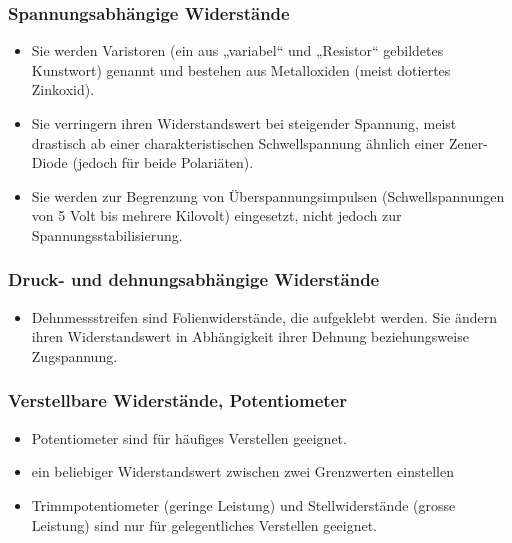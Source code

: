\subsubsection{Spannungsabhängige Widerstände}
\begin{itemize}
  \item Sie werden Varistoren (ein aus „variabel“ und „Resistor“ gebildetes
  Kunstwort) genannt und bestehen aus Metalloxiden (meist dotiertes Zinkoxid).
  \item Sie verringern ihren Widerstandswert bei steigender Spannung, meist
  drastisch ab einer charakteristischen Schwellspannung ähnlich einer
  Zener-Diode (jedoch für beide Polariäten).
  \item Sie werden zur Begrenzung von Überspannungsimpulsen (Schwellspannungen
  von 5 Volt bis mehrere Kilovolt) eingesetzt, nicht jedoch zur Spannungsstabilisierung.
\end{itemize}

\subsubsection{Druck- und dehnungsabhängige Widerstände}
\begin{itemize}
  \item Dehnmessstreifen sind Folienwiderstände, die aufgeklebt werden. Sie
  ändern ihren Widerstandswert in Abhängigkeit ihrer Dehnung beziehungsweise
  Zugspannung.
\end{itemize}

\subsubsection{Verstellbare Widerstände, Potentiometer}
\begin{itemize}
  \item Potentiometer sind für häufiges Verstellen geeignet.
  \item ein beliebiger Widerstandswert zwischen zwei Grenzwerten einstellen
  \item Trimmpotentiometer (geringe Leistung) und Stellwiderstände (grosse
  Leistung) sind nur für gelegentliches Verstellen geeignet.
\end{itemize}


